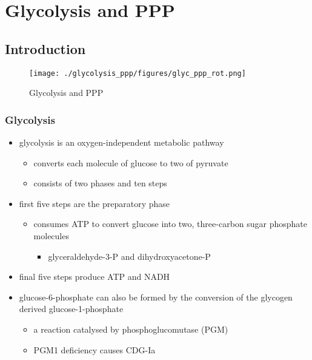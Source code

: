 \documentclass{scrartcl}
\begin{document}
\section{Glycolysis and PPP}
\label{sec:orga28105e}
\subsection{Introduction}
\label{sec:org231559c}
\begin{figure}[htbp]
\centering
\texttt{[image: ./glycolysis\_ppp/figures/glyc\_ppp\_rot.png]}
\caption{\label{fig:org107683a}
Glycolysis and PPP}
\end{figure}

\subsubsection{Glycolysis}
\label{sec:orgd965953}
\begin{itemize}
\item glycolysis is an oxygen-independent metabolic pathway
\begin{itemize}
\item converts each molecule of glucose to two of pyruvate
\item consists of two phases and ten steps
\end{itemize}
\item first five steps are the preparatory phase
\begin{itemize}
\item consumes ATP to convert glucose into two, three-carbon sugar
phosphate molecules
\begin{itemize}
\item glyceraldehyde-3-P and dihydroxyacetone-P
\end{itemize}
\end{itemize}
\item final five steps produce ATP and NADH

\item glucose-6-phosphate can also be formed by the conversion of the
glycogen derived glucose-1-phosphate
\begin{itemize}
\item a reaction catalysed by phosphoglucomutase (PGM)
\item PGM1 deficiency causes CDG-Ia
\end{itemize}
\end{itemize}
\end{document}
